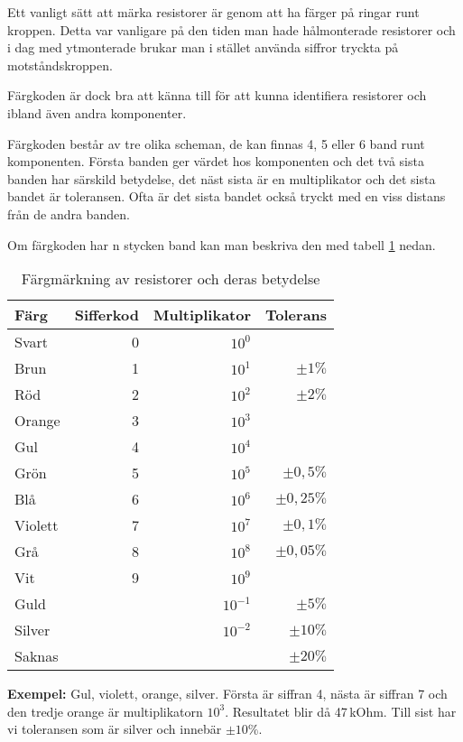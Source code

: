 Ett vanligt sätt att märka resistorer är genom att ha färger på ringar
runt kroppen. Detta var vanligare på den tiden man hade hålmonterade
resistorer och i dag med ytmonterade brukar man i stället använda
siffror tryckta på motståndskroppen.

Färgkoden är dock bra att känna till för att kunna identifiera resistorer
och ibland även andra komponenter.

Färgkoden består av tre olika scheman, de kan finnas 4, 5 eller 6 band runt
komponenten.
Första banden ger värdet hos komponenten och det två sista banden har särskild
betydelse, det näst sista är en multiplikator och det sista bandet är
toleransen.
Ofta är det sista bandet också tryckt med en viss distans från de andra banden.

Om färgkoden har n stycken band kan man beskriva den med tabell \ref{tab:rcolors} nedan.

\begin{table}[H]
\begin{tabular}{lrrr}
	\textbf{Färg}    & \textbf{Sifferkod} &     \textbf{Multiplikator} 
	&     \textbf{Tolerans} \\ \hline \hline
	Svart   &         0 &    $10^0$ &              \\ \hline
	Brun    &         1 &    $10^1$ &    $\pm 1\%$ \\ \hline
	Röd     &         2 &    $10^2$ &    $\pm 2\%$ \\ \hline
	Orange  &         3 &    $10^3$ &              \\ \hline
	Gul     &         4 &    $10^4$ &              \\ \hline
	Grön    &         5 &    $10^5$ &  $\pm 0,5\%$ \\ \hline
	Blå     &         6 &    $10^6$ & $\pm 0,25\%$ \\ \hline
	Violett &         7 &    $10^7$ &  $\pm 0,1\%$ \\ \hline
	Grå     &         8 &    $10^8$ & $\pm 0,05\%$ \\ \hline
	Vit     &         9 &    $10^9$ &              \\ \hline
	Guld    &           & $10^{-1}$ &    $\pm 5\%$ \\ \hline
	Silver  &           & $10^{-2}$ &   $\pm 10\%$ \\ \hline
	Saknas  &           &           &   $\pm 20\%$ \\ \hline
\end{tabular}
\caption{Färgmärkning av resistorer och deras betydelse}
\label{tab:rcolors}
\end{table}

\textbf{Exempel:} Gul, violett, orange, silver. Första är siffran 4, nästa är siffran 7 och den tredje orange är multiplikatorn $10^3$. Resultatet blir då 47\,kOhm. Till sist har vi toleransen som är silver och innebär $\pm 10\%$.
